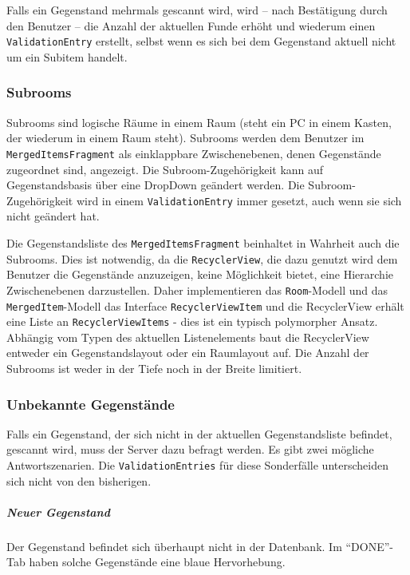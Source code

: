 Falls ein Gegenstand mehrmals gescannt wird, wird -- nach Bestätigung
durch den Benutzer -- die Anzahl der aktuellen Funde erhöht und wiederum
einen \texttt{ValidationEntry} erstellt, selbst wenn es sich bei dem
Gegenstand aktuell nicht um ein Subitem handelt.

\hypertarget{subrooms}{%
\subsubsection{Subrooms}\label{subrooms}}

Subrooms sind logische Räume in einem Raum (\zB steht ein PC in einem
Kasten, der wiederum in einem Raum steht). Subrooms werden dem Benutzer
im \texttt{MergedItemsFragment} als einklappbare Zwischenebenen, denen
Gegenstände zugeordnet sind, angezeigt. Die Subroom-Zugehörigkeit kann
auf Gegenstandsbasis über eine DropDown geändert werden. Die
Subroom-Zugehörigkeit wird in einem \texttt{ValidationEntry} immer
gesetzt, auch wenn sie sich nicht geändert hat.

Die Gegenstandsliste des \texttt{MergedItemsFragment} beinhaltet in
Wahrheit auch die Subrooms. Dies ist notwendig, da die
\texttt{RecyclerView}, die dazu genutzt wird dem Benutzer die
Gegenstände anzuzeigen, keine Möglichkeit bietet, eine Hierarchie
\bzw Zwischenebenen darzustellen. Daher implementieren das
\texttt{Room}-Modell und das \texttt{MergedItem}-Modell das Interface
\texttt{RecyclerViewItem} und die RecyclerView erhält eine Liste an
\texttt{RecyclerViewItems} - dies ist ein typisch polymorpher Ansatz.
Abhängig vom Typen des aktuellen Listenelements baut die RecyclerView
entweder ein Gegenstandslayout oder ein Raumlayout auf. Die Anzahl der
Subrooms ist weder in der Tiefe noch in der Breite limitiert.

\hypertarget{unbekannte-gegenstuxe4nde}{%
\subsubsection{Unbekannte Gegenstände}\label{unbekannte-gegenstuxe4nde}}

Falls ein Gegenstand, der sich nicht in der aktuellen Gegenstandsliste
befindet, gescannt wird, muss der Server dazu befragt werden. Es gibt
zwei mögliche Antwortszenarien. Die \texttt{ValidationEntries} für diese
Sonderfälle unterscheiden sich nicht von den bisherigen.

\hypertarget{neuer-gegenstand}{%
\subparagraph{Neuer Gegenstand}\label{neuer-gegenstand}}

Der Gegenstand befindet sich überhaupt nicht in der Datenbank. Im
``DONE''-Tab haben solche Gegenstände eine blaue Hervorhebung.

